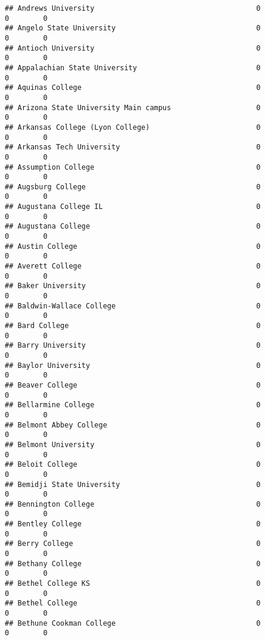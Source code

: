 \documentclass[
]{article}
\begin{document}
\begin{verbatim}
## Andrews University                                      0           0        0
## Angelo State University                                 0           0        0
## Antioch University                                      0           0        0
## Appalachian State University                            0           0        0
## Aquinas College                                         0           0        0
## Arizona State University Main campus                    0           0        0
## Arkansas College (Lyon College)                         0           0        0
## Arkansas Tech University                                0           0        0
## Assumption College                                      0           0        0
## Augsburg College                                        0           0        0
## Augustana College IL                                    0           0        0
## Augustana College                                       0           0        0
## Austin College                                          0           0        0
## Averett College                                         0           0        0
## Baker University                                        0           0        0
## Baldwin-Wallace College                                 0           0        0
## Bard College                                            0           0        0
## Barry University                                        0           0        0
## Baylor University                                       0           0        0
## Beaver College                                          0           0        0
## Bellarmine College                                      0           0        0
## Belmont Abbey College                                   0           0        0
## Belmont University                                      0           0        0
## Beloit College                                          0           0        0
## Bemidji State University                                0           0        0
## Bennington College                                      0           0        0
## Bentley College                                         0           0        0
## Berry College                                           0           0        0
## Bethany College                                         0           0        0
## Bethel College KS                                       0           0        0
## Bethel College                                          0           0        0
## Bethune Cookman College                                 0           0        0

\end{verbatim}
\end{document}
